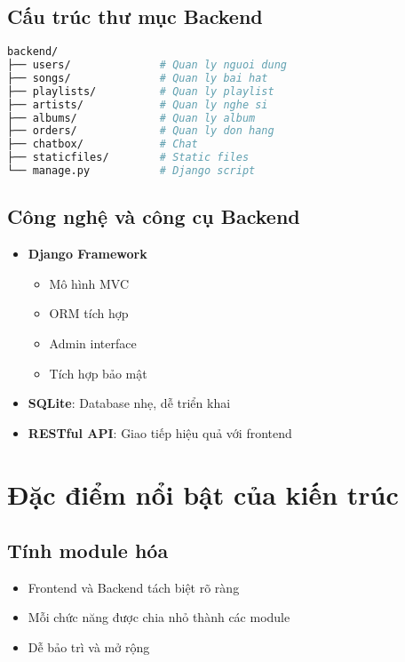 \documentclass{book}
\let\oldsection\section
\renewcommand{\section}{\clearpage\oldsection}
\begin{document}
\subsection{Cấu trúc thư mục Backend}

\begin{lstlisting}[language=bash]
backend/
├── users/              # Quan ly nguoi dung
├── songs/              # Quan ly bai hat
├── playlists/          # Quan ly playlist
├── artists/            # Quan ly nghe si
├── albums/             # Quan ly album
├── orders/             # Quan ly don hang
├── chatbox/            # Chat
├── staticfiles/        # Static files
└── manage.py           # Django script 
\end{lstlisting}

\subsection{Công nghệ và công cụ Backend}
\begin{itemize}
    \item \textbf{Django Framework}
    \begin{itemize}
        \item Mô hình MVC
        \item ORM tích hợp
        \item Admin interface
        \item Tích hợp bảo mật
    \end{itemize}
    \item \textbf{SQLite}: Database nhẹ, dễ triển khai
    \item \textbf{RESTful API}: Giao tiếp hiệu quả với frontend
\end{itemize}

\section{Đặc điểm nổi bật của kiến trúc}

\subsection{Tính module hóa}
\begin{itemize}
    \item Frontend và Backend tách biệt rõ ràng
    \item Mỗi chức năng được chia nhỏ thành các module
    \item Dễ bảo trì và mở rộng
\end{itemize}
\end{document}
